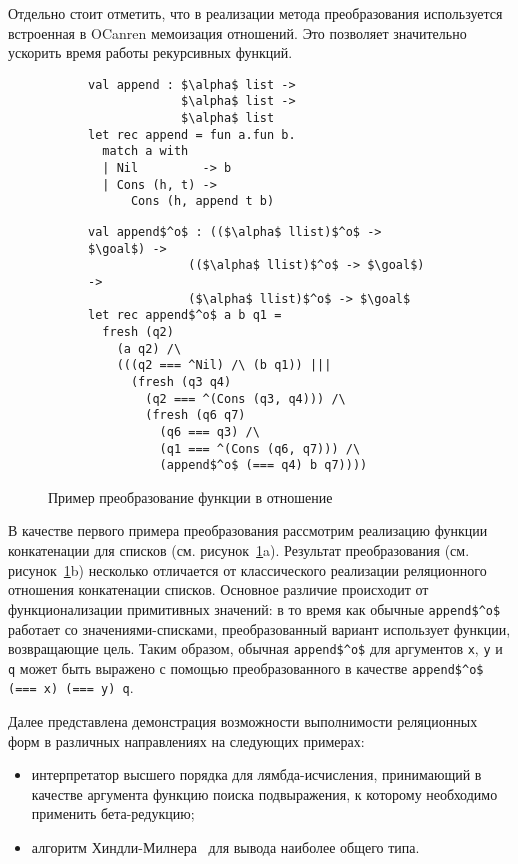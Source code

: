 Отдельно стоит отметить, что в реализации метода преобразования используется встроенная в OCanren мемоизация отношений. Это позволяет значительно ускорить время работы рекурсивных функций.

\begin{figure}[h]
  \begin{subfigure}[t]{0.4\textwidth}
    \begin{lstlisting}[basicstyle=\small]
val append : $\alpha$ list ->
             $\alpha$ list ->
             $\alpha$ list
let rec append = fun a.fun b.
  match a with
  | Nil         -> b
  | Cons (h, t) ->
      Cons (h, append t b)
    \end{lstlisting}
    \vskip1.5cm
    \caption{}
  \end{subfigure}
  \begin{subfigure}[t]{0.6\textwidth}    
    \begin{lstlisting}[basicstyle=\small]
val append$^o$ : (($\alpha$ llist)$^o$ -> $\goal$) ->
              (($\alpha$ llist)$^o$ -> $\goal$) -> 
              ($\alpha$ llist)$^o$ -> $\goal$
let rec append$^o$ a b q1 =
  fresh (q2) 
    (a q2) /\
    (((q2 === ^Nil) /\ (b q1)) |||
      (fresh (q3 q4)
        (q2 === ^(Cons (q3, q4))) /\
        (fresh (q6 q7)
          (q6 === q3) /\             
          (q1 === ^(Cons (q6, q7))) /\
          (append$^o$ (=== q4) b q7))))
    \end{lstlisting}
    \vskip-4mm
    \caption{}
  \end{subfigure}
  \vskip5mm
  \caption{Пример преобразование функции в отношение}
  \label{relational_conversion_example}
\end{figure}

В качестве первого примера преобразования рассмотрим реализацию функции конкатенации для списков (см. рисунок~\ref{relational_conversion_example}a).
Результат преобразования (см. рисунок~\ref{relational_conversion_example}b) несколько отличается от классического реализации реляционного отношения конкатенации списков. Основное различие происходит от функционализации примитивных значений: в то время как обычные \lstinline|append$^o$| работает со значениями-списками, преобразованный вариант использует функции, возвращающие цель. Таким образом, обычная \lstinline {append$^o$} для аргументов \lstinline|x|, \lstinline|y| и \lstinline |q| может быть выражено с помощью преобразованного в качестве \lstinline{append$^o$ (=== x) (=== y) q}.

Далее представлена демонстрация возможности выполнимости реляционных форм
в различных направлениях на следующих примерах:
\begin{itemize}
\item интерпретатор высшего порядка для лямбда-исчисления, принимающий в качестве аргумента функцию поиска подвыражения, к которому необходимо применить бета-редукцию;
\item алгоритм Хиндли-Милнера~\cite{lozov-spbu:Barendregt} для вывода наиболее общего типа.
\end{itemize}


